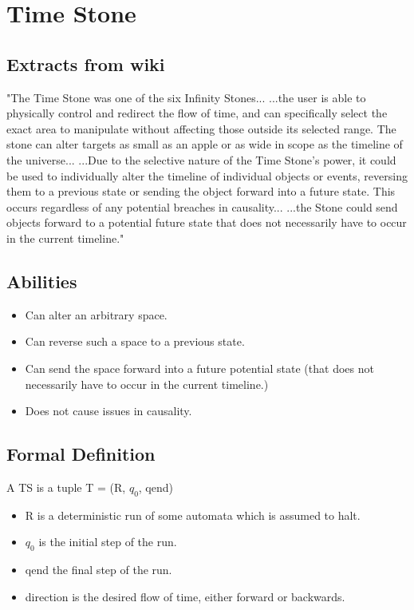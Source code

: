 \documentclass{report}
\begin{document}
\chapter{Time Stone}

\section{Extracts from wiki}

"The Time Stone was one of the six Infinity Stones... ...the user is able to physically control and redirect the flow of time, and can specifically select the exact area to manipulate without affecting those outside its selected range. The stone can alter targets as small as an apple or as wide in scope as the timeline of the universe... ...Due to the selective nature of the Time Stone's power, it could be used to individually alter the timeline of individual objects or events, reversing them to a previous state or sending the object forward into a future state. This occurs regardless of any potential breaches in causality... ...the Stone could send objects forward to a potential future state that does not necessarily have to occur in the current timeline."

\section{Abilities}

\begin{itemize}
  \item Can alter an arbitrary space.
  \item Can reverse such a space to a previous state.
  \item Can send the space forward into a future potential state (that does not necessarily have to occur in the current timeline.)
  \item Does not cause issues in causality.
\end{itemize}

\section{Formal Definition}

A TS is a tuple T = (R, $q_0$, qend)

\begin{itemize}
  \item R is a deterministic run of some automata which is assumed to halt.
  \item $q_0$ is the initial step of the run.
  \item qend the final step of the run.
  \item direction is the desired flow of time, either forward or backwards.
\end{itemize}
\end{document}
